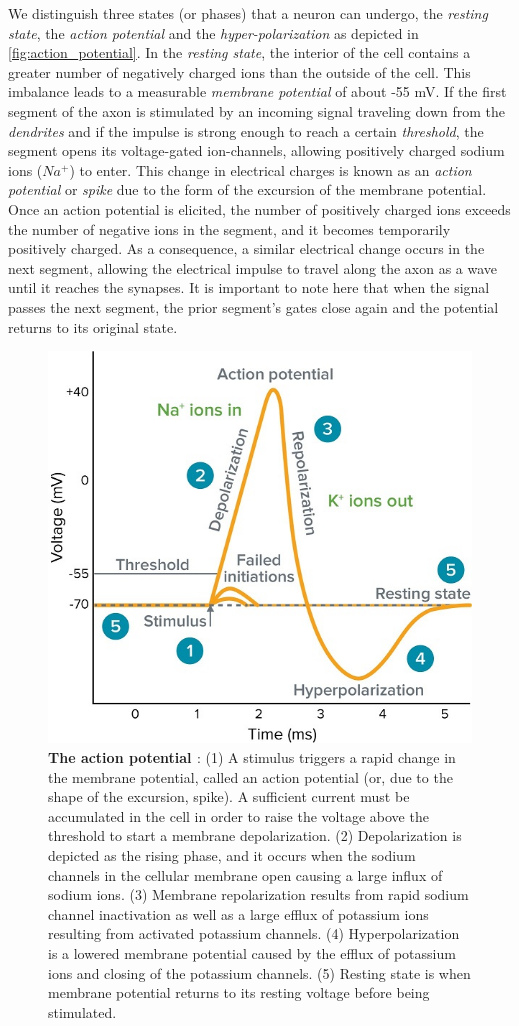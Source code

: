 We distinguish three states (or phases) that a neuron can undergo, the \emph{resting state}, the \emph{action potential} and the \emph{hyper-polarization} as depicted in \autoref{fig:action_potential}. In the \emph{resting state}, the interior of the cell contains a greater number of negatively charged ions than the outside of the cell. This imbalance leads to a measurable \emph{membrane potential} of about -55 mV. If the first segment of the axon is stimulated by an incoming signal traveling down from the \emph{dendrites} and if the impulse is strong enough to reach a certain \emph{threshold}, the segment opens its voltage-gated ion-channels, allowing positively charged sodium ions ($Na^{+}$) to enter. This change in electrical charges is known as an \emph{action potential} or \emph{spike} due to the form of the excursion of the membrane potential. Once an action potential is elicited, the number of positively charged ions exceeds the number of negative ions in the segment, and it becomes temporarily positively charged. As a consequence, a similar electrical change occurs in the next segment, allowing the electrical impulse to travel along the axon as a wave until it reaches the synapses. It is important to note here that when the signal passes the next segment, the prior segment's gates close again and the potential returns to its original state.

\begin{figure}[ht!]
  \centering
  \includegraphics[width=.5\linewidth]{src/pic/what-is-action-potential.jpg}
  \caption{\textbf{The action potential \citep[taken from][]{what-action-potential}}: (1) A stimulus triggers a rapid change in the membrane potential, called an action potential (or, due to the shape of the excursion, spike). A sufficient current must be accumulated in the cell in order to raise the voltage above the threshold to start a membrane depolarization. (2) Depolarization is depicted as the rising phase, and it occurs when the sodium channels in the cellular membrane open causing a large influx of sodium ions. (3) Membrane repolarization results from rapid sodium channel inactivation as well as a large efflux of potassium ions resulting from activated potassium channels. (4) Hyperpolarization is a lowered membrane potential caused by the efflux of potassium ions and closing of the potassium channels. (5) Resting state is when membrane potential returns to its resting voltage before being stimulated.}
  \label{fig:action_potential}
\end{figure}


